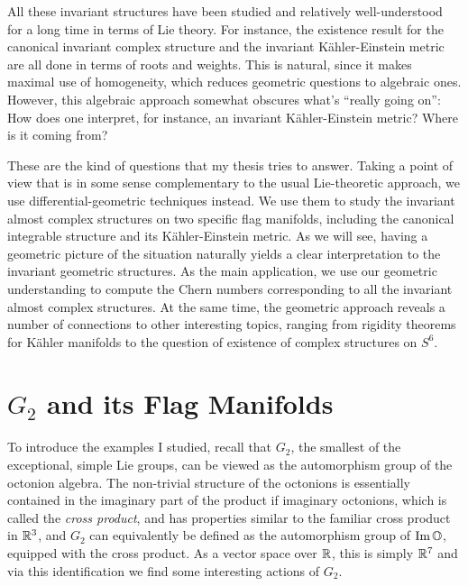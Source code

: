 \documentclass[parskip=half]{scrartcl}
\begin{document}
All these invariant structures have been studied and relatively well-understood for a long time in terms of Lie theory. For instance, the existence result for the canonical invariant complex structure and the invariant K\"ahler-Einstein metric are all done in terms of roots and weights. This is natural, since it makes maximal use of homogeneity, which reduces geometric questions to algebraic ones. However, this algebraic approach somewhat obscures what's ``really going on'': How does one interpret, for instance, an invariant K\"ahler-Einstein metric? Where is it coming from?

These are the kind of questions that my thesis tries to answer. Taking a point of view that is in some sense complementary to the usual Lie-theoretic approach, we use differential-geometric techniques instead. We use them to study the invariant almost complex structures on two specific flag manifolds, including the canonical integrable structure and its K\"ahler-Einstein metric. As we will see, having a geometric picture of the situation naturally yields a clear interpretation to the invariant geometric structures. As the main application, we use our geometric understanding to compute the Chern numbers corresponding to all the invariant almost complex structures. At the same time, the geometric approach reveals a number of connections to other interesting topics, ranging from rigidity theorems for K\"ahler manifolds to the question of existence of complex structures on $S^6$. 

\section{\texorpdfstring{$G_2$}{G2} and its Flag Manifolds}

To introduce the examples I studied, recall that $G_2$, the smallest of the exceptional, simple Lie groups, can be viewed as the automorphism group of the octonion algebra. The non-trivial structure of the octonions is essentially contained in the imaginary part of the product if imaginary octonions, which is called the \emph{cross product}, and has properties similar to the familiar cross product in $\mathbb{R}^3$, and $G_2$ can equivalently be defined as the automorphism group of $\operatorname{Im} \mathbb{O}$, equipped with the cross product. As a vector space over $\mathbb{R}$, this is simply $\mathbb{R}^7$ and via this identification we find some interesting actions of $G_2$.
\end{document}
